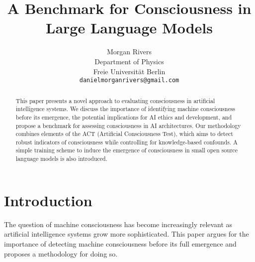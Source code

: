 \documentclass{article}
\title{A Benchmark for Consciousness in Large Language Models}
\author{Morgan Rivers \\
        Department of Physics \\
        Freie Universität Berlin \\    
        \texttt{danielmorganrivers@gmail.com}
}
\begin{document}
\maketitle

\begin{abstract}
This paper presents a novel approach to evaluating consciousness in artificial intelligence systems. We discuss the importance of identifying machine consciousness before its emergence, the potential implications for AI ethics and development, and propose a benchmark for assessing consciousness in AI architectures. Our methodology combines elements of the ACT (Artificial Consciousness Test), which aims to detect robust indicators of consciousness while controlling for knowledge-based confounds. A simple training scheme to induce the emergence of consciousness in small open source language models is also introduced.
\end{abstract}

\section{Introduction}
The question of machine consciousness has become increasingly relevant as artificial intelligence systems grow more sophisticated. This paper argues for the importance of detecting machine consciousness before its full emergence and proposes a methodology for doing so.
\end{document}
